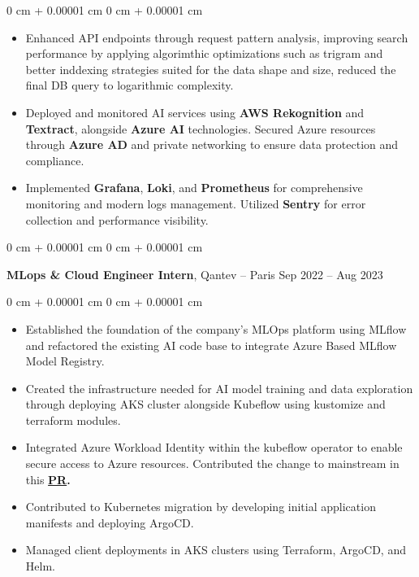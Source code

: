 \documentclass[10pt, letterpaper]{article}
\newenvironment{highlights}{ \begin{itemize}[ topsep=0.10 cm, parsep=0.10 cm, partopsep=0pt,
itemsep=0pt, leftmargin=0 cm + 10pt ] }{ \end{itemize} } %
\newenvironment{onecolentry}{ \begin{adjustwidth}{ 0 cm + 0.00001 cm }{ 0 cm + 0.00001 cm }
}{ \end{adjustwidth} } %
\newenvironment{twocolentry}[2][]{ \onecolentry \def\secondColumn{#2} \setcolumnwidth{\fill, 4.5 cm}
\begin{paracol}{2} }{ \switchcolumn \raggedleft \secondColumn \end{paracol}
\endonecolentry } %
\begin{document}
\begin{onecolentry}
\begin{highlights}
		\item Enhanced API endpoints through request pattern analysis, improving search performance by applying algorimthic optimizations such as trigram and better inddexing strategies suited for the data shape and size, reduced the final DB query to logarithmic complexity.

		\item Deployed and monitored AI services using \textbf{AWS Rekognition} and \textbf{Textract}, alongside \textbf{Azure AI} technologies. Secured Azure resources through \textbf{Azure AD} and private networking to ensure data protection and compliance.

		\item Implemented \textbf{Grafana}, \textbf{Loki}, and \textbf{Prometheus} for comprehensive monitoring and modern logs management. Utilized \textbf{Sentry} for error collection and performance visibility.
	\end{highlights}
\end{onecolentry}

\vspace{0.3 cm}

\begin{twocolentry}
	{ Sep 2022 – Aug 2023 } \textbf{MLops \& Cloud Engineer Intern}, Qantev --
	Paris
\end{twocolentry}

\vspace{0.10 cm}
\begin{onecolentry}
	\begin{highlights}
		\item Established the foundation of the company's MLOps platform using MLflow and refactored the existing AI code base to integrate Azure Based MLflow Model Registry.
		\item Created the infrastructure needed for AI model training and data exploration through deploying AKS cluster alongside Kubeflow using kustomize and terraform modules.
		\item Integrated Azure Workload Identity within the kubeflow operator to enable secure access to Azure resources. Contributed the change to mainstream in this \textbf{\href{https://github.com/kubeflow/kubeflow/pull/7091}{PR}.
		}
		\item Contributed to Kubernetes migration by developing initial application manifests and deploying ArgoCD.
		\item Managed client deployments in AKS clusters using Terraform, ArgoCD, and Helm.
	\end{highlights}
\end{onecolentry}
\end{document}
